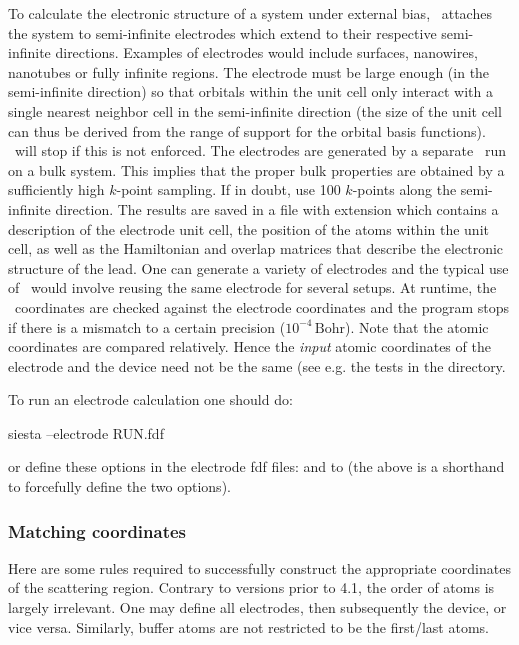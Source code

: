To calculate the electronic structure of a system under external bias,
\tsiesta\ attaches the system to semi-infinite electrodes which extend
to their respective semi-infinite directions. Examples of electrodes
would include surfaces, nanowires, nanotubes or fully infinite
regions. The electrode must be large enough (in the semi-infinite
direction) so that orbitals within the unit cell only interact with a
single nearest neighbor cell in the semi-infinite direction (the size
of the unit cell can thus be derived from the range of support for the
orbital basis functions). \tsiesta\ will stop if this is not
enforced. The electrodes are generated by a separate \tsiesta\ run on
a bulk system. This implies that the proper bulk properties are
obtained by a sufficiently high $k$-point sampling. If in doubt, use
100 $k$-points along the semi-infinite direction. The results are
saved in a file with extension  which contains a
description of the electrode unit cell, the position of the atoms
within the unit cell, as well as the Hamiltonian and overlap matrices
that describe the electronic structure of the lead. One can generate a
variety of electrodes and the typical use of \tsiesta\ would involve
reusing the same electrode for several setups. At runtime, the
\tsiesta\ coordinates are checked against the electrode coordinates
and the program stops if there is a mismatch to a certain precision
($10^{-4}\,\mathrm{Bohr}$). Note that the atomic coordinates are
compared relatively. Hence the \emph{input} atomic coordinates of the
electrode and the device need not be the same (see e.g. the tests in
the  directory.

To run an electrode calculation one should do:
\begin{shellexample}
  siesta --electrode RUN.fdf
\end{shellexample}
or define these options in the electrode fdf files:
 and  to  (the above
 is a shorthand to forcefully define the two options).


\subsubsection{Matching coordinates}

Here are some rules required to successfully construct the appropriate
coordinates of the scattering region. Contrary to versions prior to
4.1, the order of atoms is largely irrelevant. One may define all
electrodes, then subsequently the device, or vice versa. Similarly,
buffer atoms are not restricted to be the first/last atoms.

